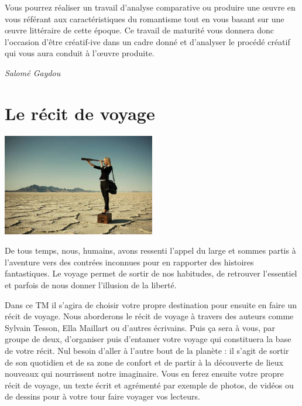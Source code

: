 \documentclass[
  10pt,
  french,
  a5paper,
  openany]{book}
\newenvironment{signature}{\begin{flushright}}{\end{flushright}}
\begin{document}
Vous pourrez réaliser un travail d'analyse comparative ou produire une œuvre en vous référant aux caractéristiques du romantisme tout en vous basant sur une œuvre littéraire de cette époque. Ce travail de maturité vous donnera donc l'occasion d'être créatif-ive dans un cadre donné et d'analyser le procédé créatif qui vous aura conduit à l'œuvre produite.

\begin{signature}
\emph{Salomé Gaydou}

\end{signature}

\hypertarget{le-ruxe9cit-de-voyage}{%
\chapter{Le récit de voyage}\label{le-ruxe9cit-de-voyage}}

\begin{center}
\includegraphics[width=\textwidth,height=12em]{images/le-recit-de-voyage.jpg}

\end{center}

De tous temps, nous, humains, avons ressenti l'appel du large et sommes partis à l'aventure vers des contrées inconnues pour en rapporter des histoires fantastiques. Le voyage permet de sortir de nos habitudes, de retrouver l'essentiel et parfois de nous donner l'illusion de la liberté.

Dans ce TM il s'agira de choisir votre propre destination pour ensuite en faire un récit de voyage. Nous aborderons le récit de voyage à travers des auteurs comme Sylvain Tesson, Ella Maillart ou d'autres écrivains. Puis ça sera à vous, par groupe de deux, d'organiser puis d'entamer votre voyage qui constituera la base de votre récit. Nul besoin d'aller à l'autre bout de la planète : il s'agit de sortir de son quotidien et de sa zone de confort et de partir à la découverte de lieux nouveaux qui nourrissent notre imaginaire. Vous en ferez ensuite votre propre récit de voyage, un texte écrit et agrémenté par exemple de photos, de vidéos ou de dessins pour à votre tour faire voyager vos lecteurs.
\end{document}
